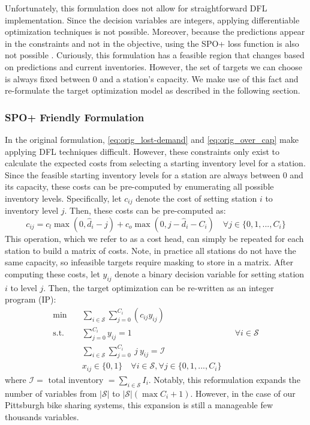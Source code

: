 \documentclass{article}
\begin{document}
Unfortunately, this formulation does not allow for straightforward DFL implementation. Since the decision variables are integers, applying differentiable optimization techniques \cite{amos2017optnet} is not possible. Moreover, because the predictions appear in the constraints and not in the objective, using the SPO+ loss function is also not possible \cite{elmachtoub2022spo}. 
Curiously, this formulation has a feasible region that changes based on predictions and current inventories. However, the set of targets we can choose is always fixed between $0$ and a station's capacity. We make use of this fact and re-formulate the target optimization model as described in the following section.

\subsubsection{SPO+ Friendly Formulation}
In the original formulation, \cref{eq:orig_lost-demand} and \cref{eq:orig_over_cap} make applying DFL techniques difficult. However, these constraints only exist to calculate the expected costs from selecting a starting inventory level for a station. Since the feasible starting inventory levels for a station are always between $0$ and its capacity, these costs can be 
pre-computed by enumerating all possible inventory levels. Specifically, let $c_{ij}$ denote the cost of setting station $i$ to inventory level $j$. Then, these costs can be pre-computed as: 
\begin{equation}
  c_{ij} = c_l \max(0, \hat{d}_i - j ) + c_o \max(0, j - \hat{d}_i - C_i) \quad \forall j \in \{0, 1, ..., C_i\} \label{eq:cost_head}
\end{equation} 
This operation, which we refer to as a cost head, can simply be repeated for each station to build a matrix of costs. Note, in practice all stations do not have the same capacity, so infeasible targets require masking to store in a matrix. After computing these costs, let $y_{ij}$ denote a binary decision variable for setting station $i$ to level $j$. Then, the target optimization can be re-written 
as an integer program (IP):
\begin{align}
\min \quad & \sum_{i \in \mathcal{S}} \sum\limits_{j=0}^{C_i} (c_{ij} y_{ij}) \label{eq:new_objective} \\
\text{s.t.} \quad & \sum\limits_{j=0}^{C_i} y_{ij} = 1 && \forall i \in \mathcal{S} \label{eq:new_one_target} \\
& \sum_{i \in \mathcal{S}} \sum\limits_{j=0}^{C_i} ~j~y_{ij}  = \mathcal{I} \label{eq:new_total_inv} \\
& x_{ij} \in \{0, 1\} \quad \forall i \in \mathcal{S}, \forall j \in \{0, 1, ..., C_i\} \nonumber
\end{align}
where  $\mathcal{I} = \text{ total inventory } = \sum_{i \in \mathcal{S}} I_i$. Notably, this reformulation expands the number of variables from $| \mathcal{S} |$ to $|\mathcal{S}| (\max{C_i} + 1)$. However, in the case of our Pittsburgh bike sharing systems, this expansion is still a manageable few thousands variables.
\end{document}

